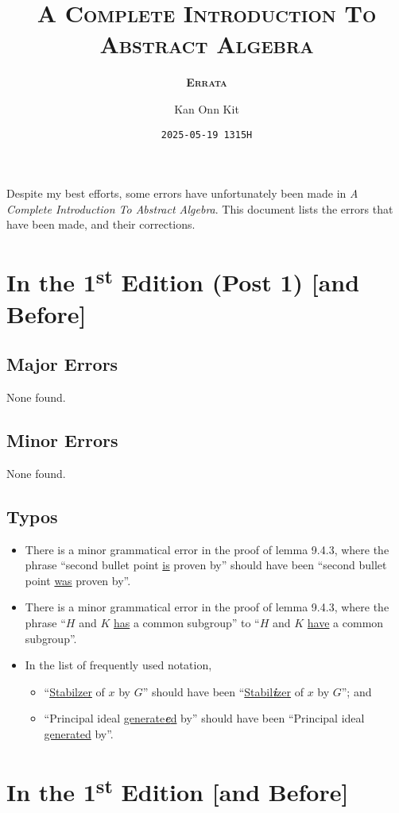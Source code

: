 \documentclass[
    a4paper,
    chapterprefix,
    DIV=9
]{scrartcl}
\title{\bfseries\scshape A Complete Introduction To\\Abstract Algebra}
\subtitle{\bfseries\scshape Errata}
\date{\texttt{2025-05-19 1315H}}
\author{Kan Onn Kit}
\begin{document}
\maketitle

Despite my best efforts, some errors have unfortunately been made in \textit{A Complete Introduction To Abstract Algebra}. This document lists the errors that have been made, and their corrections.

\section*{In the 1\textsuperscript{st} Edition (Post 1) [and Before]}
\subsection*{Major Errors}
None found.

\subsection*{Minor Errors}
None found.

\subsection*{Typos}
\begin{itemize}
    \item There is a minor grammatical error in the proof of lemma 9.4.3, where the phrase ``second bullet point \underline{is} proven by'' should have been ``second bullet point \underline{was} proven by''.
    \item There is a minor grammatical error in the proof of lemma 9.4.3, where the phrase ``$H$ and $K$ \underline{has} a common subgroup'' to ``$H$ and $K$ \underline{have} a common subgroup''.
    \item In the list of frequently used notation,
    \begin{itemize}
        \item ``\underline{Stabilzer} of $x$ by $G$'' should have been ``\underline{Stabil\textbf{\textit{i}}zer} of $x$ by $G$''; and
        \item ``Principal ideal \underline{generate\textbf{\textit{e}}d} by'' should have been ``Principal ideal \underline{generated} by''.
    \end{itemize}
\end{itemize}

\section*{In the 1\textsuperscript{st} Edition [and Before]}
\end{document}
